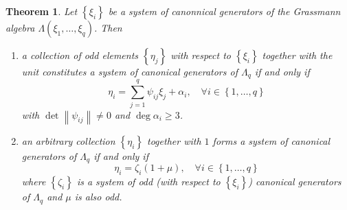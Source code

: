 \documentclass{article}
\newtheorem{theorem}{Theorem}
\theoremstyle{definition}
\begin{document}
\begin{theorem}
    \label{thm:grassmann_canonical_generators}
    Let $\left\{ \xi_i \right\}$ be a system of canonnical generators of the Grassmann algebra $\Lambda(\xi_1, \dots, \xi_q)$. Then
    \begin{enumerate}
        \item a collection of odd elements $\left\{ \eta_j \right\}$ with respect to $\left\{ \xi_i \right\}$ together with the unit constitutes a system of canonical generators of $\Lambda_q$ if and only if
        \begin{equation*}
            \eta_i = \sum_{j = 1}^q \psi_{ij} \xi_j + \alpha_i, \quad \forall i \in \left\{ 1, \dots, q \right\}
        \end{equation*}
        with $\det \left\| \psi_{ij} \right\| \neq 0$ and $\deg \alpha_i \geq 3$.
        \item an arbitrary collection $\left\{ \eta_i \right\}$ together with $1$ forms a system of canonical generators of $\Lambda_q$ if and only if
        \begin{equation}
            \label{eq:canonical_generators}
            \eta_i = \zeta_i(1 + \mu), \quad \forall i \in \left\{ 1, \dots, q \right\}
        \end{equation}
        where $\left\{ \zeta_i \right\}$ is a system of odd (with respect to $\left\{ \xi_i \right\}$) canonical generators of $\Lambda_q$ and $\mu$ is also odd.
    \end{enumerate}
\end{theorem}
\end{document}

